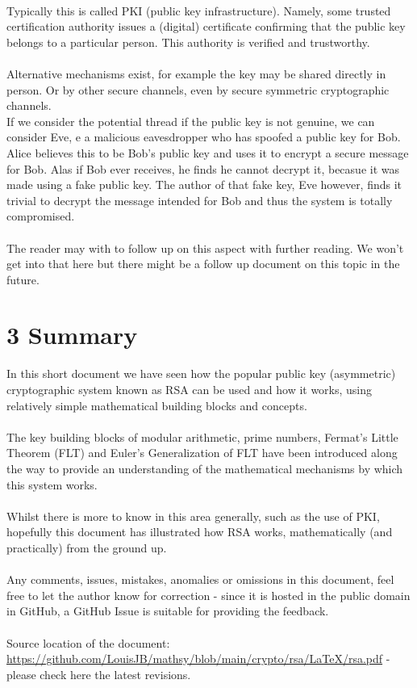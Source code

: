\documentclass[11pt]{article}   	%
\begin{document}
\\
Typically this is called PKI (public key infrastructure). Namely, some trusted certification authority issues a (digital) certificate confirming that the public key belongs to a particular person. This authority is verified and trustworthy. \\
\\
Alternative mechanisms exist, for example the key may be shared directly in person. Or by other secure channels, even by secure symmetric cryptographic channels.
\\
If we consider the potential thread if the public key is not genuine, we can consider Eve, e a malicious eavesdropper who has spoofed a public key for Bob. Alice believes this to be Bob's public key and uses it to encrypt a secure message for Bob. Alas if Bob ever receives, he finds he cannot decrypt it, becasue it was made using a fake public key. The author of that fake key, Eve however, finds it trivial to decrypt the message intended for Bob and thus the system is totally compromised. \\
\\
The reader may with to follow up on this aspect with further reading.  We won't get into that here but there might be a follow up document on this topic in the future.

\break


\section*{3 Summary}

In this short document we have seen how the popular public key (asymmetric) cryptographic system known as RSA can be used and how it works, using relatively simple mathematical building blocks and concepts. \\
\\
The key building blocks of modular arithmetic, prime numbers, Fermat's Little Theorem (FLT) and Euler's Generalization of FLT have been introduced along the way to provide an understanding of the mathematical mechanisms by which this system works. \\
\\
Whilst there is more to know in this area generally, such as the use of PKI, hopefully this document has illustrated how RSA works, mathematically (and practically) from the ground up. \\
\\
Any comments, issues, mistakes, anomalies or omissions in this document, feel free to let the author know for correction - since it is hosted in the public domain in GitHub, a GitHub Issue is suitable for providing the feedback. \\
\\
Source location of the document: \url{https://github.com/LouisJB/mathsy/blob/main/crypto/rsa/LaTeX/rsa.pdf} - please check here the latest revisions.
\end{document}
